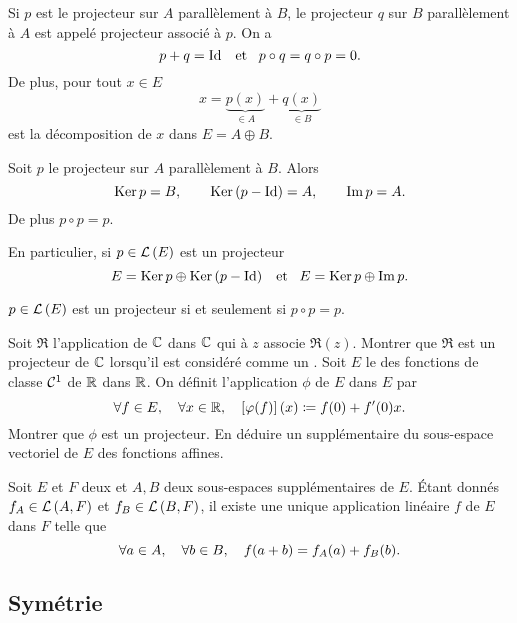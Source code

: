\documentclass{magnolia}
\begin{document}
\begin{definition}[utile=1]
Si $p$ est le projecteur sur $A$ parallèlement à $B$, le projecteur $q$ sur
$B$ parallèlement à $A$ est appelé projecteur associé à $p$. On a
\[p+q=\operatorname{Id} \quad\!\text{et}\quad\! p\circ q=q\circ p=0.\]
De plus, pour tout $x\in E$
\[x=\underbrace{p(x)}_{\in A}+\underbrace{q(x)}_{\in B}\]  
est la décomposition de $x$ dans $E=A\oplus B$.
\end{definition}

\begin{proposition}[utile=1]
Soit $p$ le projecteur sur $A$ parallèlement à $B$. Alors
\[\mathop{\rm Ker} p=B, \qquad \mathop{\rm Ker}\left(p-\operatorname{Id}\right)=A, \qquad \operatorname{Im} p=A.\]
De plus $p\circ p=p$.
\end{proposition}

\begin{remarqueUnique}
\remarque[utile=1] En particulier, si $p\in\mathcal{L}\left(E\right)$ est un projecteur
  \[E=\mathop{\rm Ker} p\oplus\mathop{\rm Ker}\left(p-\operatorname{Id}\right) \quad\!\text{et}\quad\! E=\mathop{\rm Ker} p\oplus\operatorname{Im} p.\]
\end{remarqueUnique}

\begin{proposition}[utile=3]
$p\in\mathcal{L}\left(E\right)$ est un projecteur si et seulement si $p\circ p=p$.  
\end{proposition}

\begin{exos}
\exo Soit $\Re$ l'application de $\mathbb{C}$ dans $\mathbb{C}$ qui à $z$ associe
  $\Re(z)$. Montrer que $\Re$ est un projecteur de $\mathbb{C}$ lorsqu'il est considéré
  comme un \Rev.
\exo Soit $E$ le \Rev des fonctions de classe $\mathcal{C}^{1}$ de $\mathbb{R}$ dans
  $\mathbb{R}$. On définit l'application $\phi$ de $E$ dans $E$ par
  \[\forall f\in E ,\quad \forall x\in\mathbb{R} ,\quad \left[\varphi(f)\right](x)\coloneqq f(0)+f'(0)x.\]
  Montrer que $\phi$ est un projecteur. En déduire un supplémentaire du
  sous-espace vectoriel de $E$ des fonctions affines.
\end{exos}

\begin{proposition}[utile=1]
Soit $E$ et $F$ deux \Kevs et $A,B$ deux sous-espaces supplémentaires de $E$.
Étant donnés $f_A\in\mathcal{L}\left(A,F\right)$ et $f_B\in\mathcal{L}\left(B,F\right)$, il existe une unique
application linéaire $f$ de $E$ dans $F$ telle que
\[\forall a\in A ,\quad \forall b\in B ,\quad f(a+b)=f_A(a)+f_B(b).\]
\end{proposition}

\subsection{Symétrie}
\end{document}
